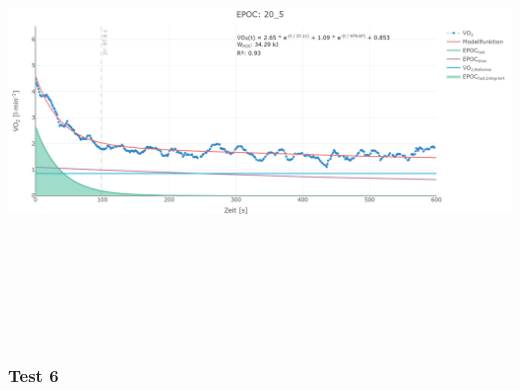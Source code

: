 \documentclass[
  letterpaper,
  DIV=11]{scrartcl}
\begin{document}
\includegraphics[width=11.45833in,height=4.6875in]{images/20_5.png}

\subsubsection{Test 6}
\end{document}
